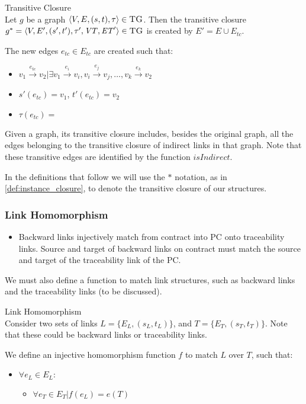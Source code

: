 \begin{definition}{Transitive Closure\\}
\label{def:instance_closure}
Let $g$ be a graph $\langle V,E,(s, t),\tau\rangle \in \textsc{TG}$. Then the transitive closure $g^{*} = \langle V,E',(s', t'),\tau', \mathit{VT}, \mathit{ET}' \rangle \in \textsc{TG}$ is created by $E' = E \cup E_{tc}$. 

The new edges $e_{tc} \in E_{tc}$ are created such that:

\begin{itemize}
\item $v_1\xrightarrow{e_{tc}}v_2 | \exists v_1\xrightarrow{e_i}v_i, v_i\xrightarrow{e_j}v_j, \dots, v_k\xrightarrow{e_k}v_2$
\item $s'(e_{tc}) = v_1$, $t'(e_{tc}) = v_2$
\item $\tau(e_{tc}) = $
\end{itemize}

\end{definition}


Given a graph, its transitive closure includes, besides the original graph, all the edges belonging to the transitive closure of indirect links in that graph. Note that these transitive edges are identified by the function $\mathit{isIndirect}$.

In the definitions that follow we will use the $*$ notation, as in \cref{def:instance_closure}, to denote the transitive closure of our structures.





\subsubsection{Link Homomorphism}

\begin{itemize}
\item Backward links injectively match from contract into PC onto traceability links. Source and target of backward links on contract must match the source and target of the traceability link of the PC.
\end{itemize}

We must also define a function to match link structures, such as backward links and the traceability links (to be discussed).

\begin{definition}{Link Homomorphism\\}
\label{def:link_homomorphism}
Consider two sets of links $L = \{E_{L}, (s_{L}, t_{L})\}$, and $T = \{E_{T}, (s_{T}, t_{T})\}$. Note that these could be backward links or traceability links.

We define an injective homomorphism function $f$ to match $L$ over $T$, such that:

\begin{itemize}
\item $\forall e_L \in E_L:$
\begin{itemize}
\item $\forall e_T \in E_T | f(e_L) = e(T)$
\end{itemize}
\end{itemize} 
\end{definition}

